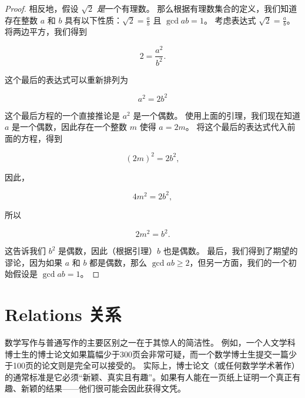\begin{proof}
  相反地，假设 $\sqrt{2}$ {\em 是}一个有理数。
  那么根据有理数集合的定义，我们知道存在整数 $a$ 和 $b$ 具有以下性质：$\displaystyle \sqrt{2} = \frac{a}{b}$ 且 $\gcd{a}{b} = 1$。
  考虑表达式 $\displaystyle \sqrt{2} = \frac{a}{b}$。将两边平方，我们得到

  \[ 2 = \frac{a^2}{b^2}.
  \]

  这个最后的表达式可以重新排列为

  \begin{equation*}
    a^2 = 2 b^2
  \end{equation*}

  这个最后方程的一个直接推论是 $a^2$ 是一个偶数。
  使用上面的引理，我们现在知道 $a$ 是一个偶数，因此存在一个整数 $m$ 使得 $a=2m$。
  将这个最后的表达式代入前面的方程，得到

  \begin{equation*}
    (2m)^2 = 2 b^2,
  \end{equation*}

  因此，

  \begin{equation*}
    4m^2 = 2 b^2,
  \end{equation*}

  所以

  \begin{equation*}
    2m^2 = b^2.
  \end{equation*}

  这告诉我们 $b^2$ 是偶数，因此（根据引理）$b$ 也是偶数。
  最后，我们得到了期望的谬论，因为如果 $a$ 和 $b$ 都是偶数，那么 $\gcd{a}{b} \geq 2$，但另一方面，我们的一个初始假设是 $\gcd{a}{b} = 1$。
\end{proof}

\newpage




\newpage

\section{Relations 关系}
\label{sec:rel_intro}

数学写作与普通写作的主要区别之一在于其惊人的简洁性。
例如，一个人文学科博士生的博士论文如果篇幅少于300页会非常可疑，而一个数学博士生提交一篇少于100页的论文则是完全可以接受的。
实际上，博士论文（或任何数学学术著作）的通常标准是它必须“新颖、真实且有趣”。如果有人能在一页纸上证明一个真正有趣、新颖的结果——他们很可能会因此获得文凭。

